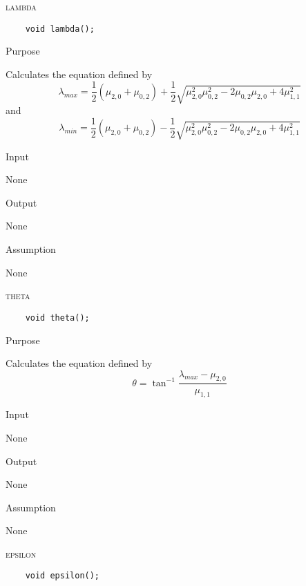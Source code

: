 \documentclass[pdftex, 11pt]{article}
\begin{document}
\begin{description}
	\item{\textsc{lambda}}
		\begin{description}
\begin{lstlisting}
	void lambda();
\end{lstlisting}

			\item{Purpose}

				Calculates the equation defined by
				\[
				\lambda_{max} = \frac{1}{2} (\mu_{2,0} + \mu_{0,2}) + \frac{1}{2} \sqrt{ \mu_{2,0}^2 \mu_{0,2}^2 -
				2\mu_{0,2} \mu_{2,0} + 4 \mu_{1,1}^2 }
				\]
				and
				\[
				\lambda_{min} = \frac{1}{2} (\mu_{2,0} + \mu_{0,2}) - \frac{1}{2} \sqrt{ \mu_{2,0}^2 \mu_{0,2}^2 -
				2\mu_{0,2} \mu_{2,0} + 4 \mu_{1,1}^2 }
				\]

			\item{Input}

				None

			\item{Output}

				None

			\item{Assumption}

				None

		\end{description}

	\item{\textsc{theta}}
		\begin{description}
\begin{lstlisting}
	void theta();
\end{lstlisting}

			\item{Purpose}

				Calculates the equation defined by
				\[
				\theta = \tan^{-1} { \frac{\lambda_{max} - \mu_{2,0}}{\mu_{1,1}} }	
				\]

			\item{Input}

				None

			\item{Output}

				None

			\item{Assumption}

				None

		\end{description}

	\item{\textsc{epsilon}}
		\begin{description}
\begin{lstlisting}
	void epsilon();
\end{lstlisting}


\end{description}
\end{description}
\end{document}
